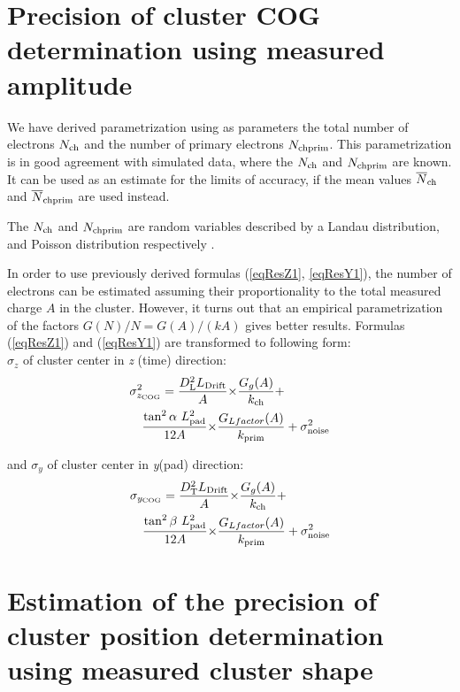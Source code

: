 \documentclass[a4paper,12pt]{article}
\begin{document}
\section{Precision of cluster COG determination using measured
amplitude}

We have derived parametrization using as parameters the total
number of electrons ${N_{\rm{ch}}}$ and the number of primary
electrons ${N_{\rm{chprim}}}$. This parametrization is in good
agreement with simulated data, where the ${N_{\rm{ch}}}$ and
${N_{\rm{chprim}}}$ are known. It can be  used as an estimate for
the limits of accuracy, if the mean values
$\overline{N}_{\rm{ch}}$ and $\overline{N}_{\rm{chprim}}$ are used
instead.

The ${N_{\rm{ch}}}$ and ${N_{\rm{chprim}}}$ are random variables
described by a Landau distribution, and  Poisson distribution
respectively .

In order to use previously derived formulas (\ref{eqResZ1},
\ref{eqResY1}), the number of electrons can be estimated  assuming
their proportionality to the total measured charge $A$ in the
cluster. However, it turns out that an empirical parametrization
of the factors $G(N)/N=G(A)/(kA)$ gives better results.
Formulas (\ref{eqResZ1}) and (\ref{eqResY1}) are transformed to following form:\\

{$\sigma_{z}$} of cluster center in {\it{z}} (time) direction:
    \begin{eqnarray}
     \lefteqn{\sigma^2_{z_{\rm{COG}}} =
     \frac{D^2_{\rm{L}}L_{\rm{Drift}}}{A}{\times}\frac{G_g(A)}{k_{\rm{ch}}}+}\nonumber\\
        &&{}
        \frac{\tan^2\alpha~L_{\rm{pad}}^2}{12A}{\times}\frac{G_{Lfactor}(A)}{k_{\rm{prim}}}+\sigma^2_{\rm{noise}}
        \label{eqZtotAmp}
    \end{eqnarray}

and {$\sigma_{y}$} of cluster center in {\it{y}}(pad) direction:
    \begin{eqnarray}
     \lefteqn{\sigma_{y_{\rm{COG}}} =
     \frac{D^2_{\rm{T}}L_{\rm{Drift}}}{A}{\times}\frac{G_g(A)}{k_{\rm{ch}}}+}\nonumber\\
        &&{}
        \frac{\tan^2\beta~L_{\rm{pad}}^2}{12A}{\times}\frac{G_{Lfactor}(A)}{k_{\rm{prim}}}+\sigma^2_{\rm{noise}}
        \label{eqYtotAmp}
    \end{eqnarray}

\section{Estimation of the precision of cluster  position
determination using measured cluster shape}
\end{document}
